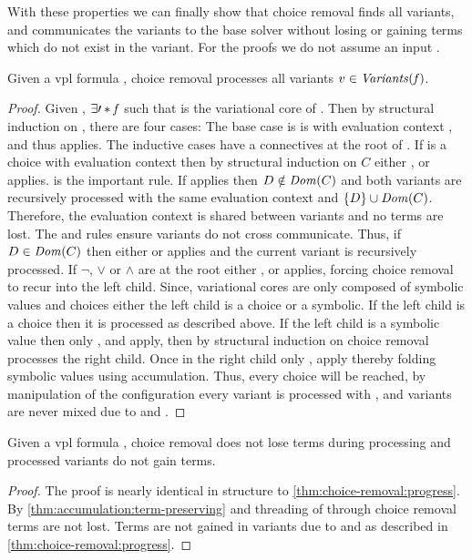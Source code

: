 With these properties we can finally show that choice removal finds all
variants, and communicates the variants to the base solver without losing or
gaining terms which do not exist in the variant. For the proofs we do not assume
an input \vc{}.

\begin{theorem}
  \label{thm:choice-removal:progress}
  Given a \ac{vpl} formula \fV{}, choice removal processes all variants $v \in
  \mathit{Variants}(\mathit{f})$.
\end{theorem}
%
\begin{proof}
  Given \fV{}, $\exists \prime*{\mathit{f}}$ such that \prime*{\fV} is the variational
  core of \fV{}. Then by structural induction on \prime*{\fV{}}, there are four
  cases: The base case is \prime*{\fV} is \unit{} with evaluation context
  \inRoot{}, and thus \crEval{} applies. The inductive cases have a connectives
  at the root of \prime*{\fV}. If \prime*{\fV} is a choice with evaluation
  context \zV{} then by structural induction on $C$ either \crChc{}, \crChcT{}
  or \crChcF{} applies. \crChc{} is the important rule. If \crChc{} applies then
  $D \notin \mathit{Dom}({C})$ and both variants are recursively processed with the
  same evaluation context and $\set{D} \cup \domain{C}$. Therefore, the
  evaluation context is shared between variants and no terms are lost. The
  \crChcT{} and \crChcF{} rules ensure variants do not cross communicate. Thus,
  if $D \in \mathit{Dom}({C})$ then either \crChcT{} or \crChcF{} applies and the
  current variant is recursively processed. If $\neg$, $\vee$ or $\wedge$ are at
  the root either \crAnd{}, \crOr{} or \crNot{} applies, forcing choice removal
  to recur into the left child. Since, variational cores are only composed of
  symbolic values and choices either the left child is a choice or a symbolic.
  If the left child is a choice then it is processed as described above. If the
  left child is a symbolic value then only \crAndL{}, \crOrL{} and \crNotIn{}
  apply, then by structural induction on \zV{} choice removal processes the
  right child. Once in the right child only \crAndR{}, \crOrR{} apply thereby
  folding symbolic values using accumulation. Thus, every choice will be
  reached, by manipulation of the configuration every variant is processed with
  \crChc{}, and variants are never mixed due to \crChcT{} and \crChcF{}.
\end{proof}

\begin{theorem}
  \label{thm:choice-removal:preservation}
  Given a \ac{vpl} formula \fV{}, choice removal does not lose terms during
  processing \fV{} and processed variants do not gain terms.
\end{theorem}
%
\begin{proof}
  The proof is nearly identical in structure to
  \autoref{thm:choice-removal:progress}. By
  \autoref{thm:accumulation:term-preserving} and threading of \aStore{} through
  choice removal terms are not lost. Terms are not gained in variants due to
  \crChcT{} and \crChcF{} as described in \autoref{thm:choice-removal:progress}.
\end{proof}

